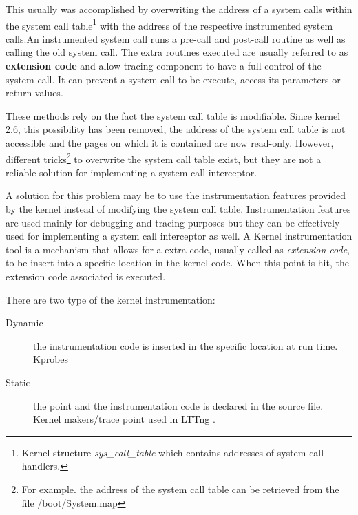 This usually was accomplished by overwriting  the address of a system calls within the system call table\footnote{Kernel structure \textit{sys\_call\_table} which contains addresses of system call handlers.} with the address of the respective instrumented system calls.An instrumented system call runs a pre-call and post-call routine as well as calling the old system call. The extra routines executed are usually referred to as \textbf{extension code} and allow tracing component to have a full control of the system call. It can prevent a system call to be execute, access its parameters or return values.

These methods rely on the fact the system call table is modifiable. Since kernel 2.6, this possibility has been removed, the address of the system call table is not accessible and the pages on which it is contained are now read-only. However, different tricks\footnote{For example. the address of the system call table can be retrieved from the file /boot/System.map} to overwrite the system call table exist, but they are not a reliable solution for implementing a system call interceptor.

A solution for this problem may be to use the instrumentation features provided by the kernel instead of modifying the system call table. Instrumentation features are used mainly for debugging and tracing purposes but they can be effectively used for implementing a system call interceptor as well. A Kernel instrumentation tool is a mechanism that allows for a extra code, usually called as \textit{extension code}, to be insert into a specific location in the kernel code. When this point is hit, the extension code associated is executed.
 
There are two type of the kernel instrumentation:
	\begin{description}
	\item[Dynamic] the instrumentation code is inserted in the specific location at run time. Kprobes \cite{Sudhanshu:2006:Online}
	\item[Static]  the point and the instrumentation code is declared in the source file. Kernel makers/trace point used in LTTng \cite{lttng} .
	\end{description}
	
